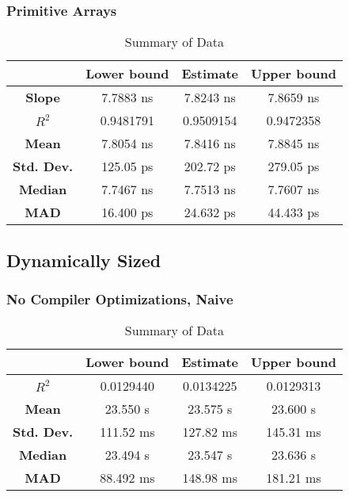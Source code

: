 \subsubsection{Primitive Arrays}
\begin{table}[H]
\centering
\begin{tabular}{|c|c|c|c|}
\hline
\textbf{} & \textbf{Lower bound} & \textbf{Estimate} & \textbf{Upper bound} \\
\hline
\textbf{Slope} & 7.7883 ns & 7.8243 ns & 7.8659 ns \\
\hline
\textbf{$R^2$} & 0.9481791 & 0.9509154 & 0.9472358 \\
\hline
\textbf{Mean} & 7.8054 ns & 7.8416 ns & 7.8845 ns \\
\hline
\textbf{Std. Dev.} & 125.05 ps & 202.72 ps & 279.05 ps \\
\hline
\textbf{Median} & 7.7467 ns & 7.7513 ns & 7.7607 ns \\
\hline
\textbf{MAD} & 16.400 ps & 24.632 ps & 44.433 ps \\
\hline
\end{tabular}
\caption{Summary of Data}
\label{tab:data_summary_3}
\end{table}


\subsection{Dynamically Sized}

\subsubsection{No Compiler Optimizations, Naive}
\begin{table}[H]
\centering
\begin{tabular}{|c|c|c|c|}
\hline
\textbf{} & \textbf{Lower bound} & \textbf{Estimate} & \textbf{Upper bound} \\
\hline
\textbf{$R^2$} & 0.0129440 & 0.0134225 & 0.0129313 \\
\hline
\textbf{Mean} & 23.550 s & 23.575 s & 23.600 s \\
\hline
\textbf{Std. Dev.} & 111.52 ms & 127.82 ms & 145.31 ms \\
\hline
\textbf{Median} & 23.494 s & 23.547 s & 23.636 s \\
\hline
\textbf{MAD} & 88.492 ms & 148.98 ms & 181.21 ms \\
\hline
\end{tabular}
\caption{Summary of Data}
\label{tab:data_summary_4}
\end{table}


